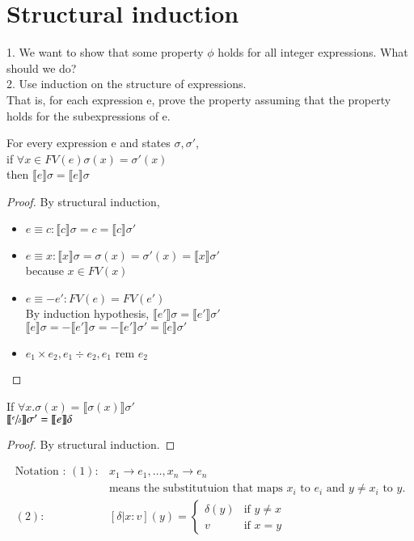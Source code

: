 \documentclass{article}[12pt]
\begin{document}
\section{Structural induction}
1. We want to show that some property $\phi$ holds for all integer expressions. What should we do? \\
2. Use induction on the structure of expressions. \\
That is, for each expression e, prove the property assuming that the property holds for the subexpressions of e.
\begin{lemma}[Coincidence]
    For every expression e and states $\sigma, \sigma'$, \\
    if $\forall x\in FV(e) \sigma(x) = \sigma'(x) $ \\
    then $\llbracket e \rrbracket \sigma = \llbracket e \rrbracket \sigma$
\end{lemma}
\begin{proof}
    By structural induction,
    \begin{itemize}
        \item $e \equiv c : \llbracket c \rrbracket \sigma = c =  \llbracket c \rrbracket \sigma' $
        \item $e \equiv x : \llbracket x \rrbracket \sigma = \sigma(x) = \sigma'(x) = \llbracket x \rrbracket \sigma'$ \\
        because $x \in FV(x)$
        \item $e \equiv -e' : FV(e) = FV(e')$ \\
        By induction hypothesis, $\llbracket e' \rrbracket \sigma = \llbracket e' \rrbracket \sigma'$ \\
        $\llbracket e \rrbracket \sigma = - \llbracket e' \rrbracket \sigma = - \llbracket e' \rrbracket \sigma' = \llbracket e \rrbracket \sigma'$
        \item $e_1 \times e_2, e_1 \div e_2, e_1\text{ rem }e_2$
    \end{itemize}
\end{proof}
\begin{lemma}[Substitution]
    If $\forall x. \sigma(x) = \llbracket \sigma(x) \rrbracket \sigma' $ \\
    $\llbracket \sfrac{e}{\delta} \rrbracket \sigma' = \llbracket e \rrbracket \delta$
\end{lemma}
\begin{proof}
    By structural induction.
\end{proof}
\begin{align*}
    \text{Notation : }(1) : &x_1 \rightarrow e_1, \ldots, x_n \rightarrow e_n \\
    &\text{means the substitutuion that maps } x_i \text{ to }e_i \text{ and }y\neq x_i \text{ to } y. \\
    (2) : &[\delta | x:v] (y) = \begin{cases} \delta(y) & \text{if }y\neq x \\ v &\text{if }x=y\end{cases}
\end{align*}
\end{document}
